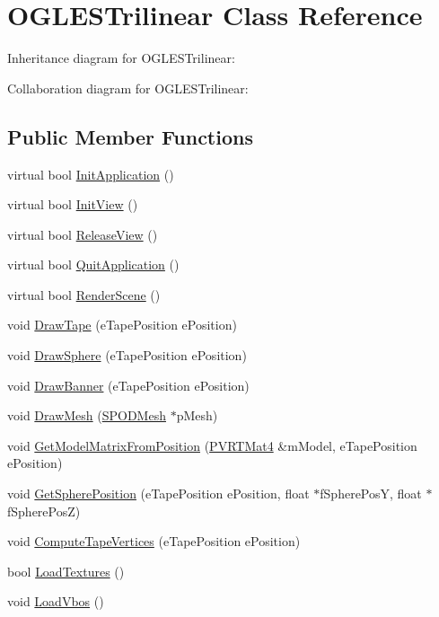 \hypertarget{class_o_g_l_e_s_trilinear}{\section{O\+G\+L\+E\+S\+Trilinear Class Reference}
\label{class_o_g_l_e_s_trilinear}
}


Inheritance diagram for O\+G\+L\+E\+S\+Trilinear\+:


Collaboration diagram for O\+G\+L\+E\+S\+Trilinear\+:
\subsection*{Public Member Functions}
\begin{DoxyCompactItemize}
\item 
virtual bool \hyperlink{class_o_g_l_e_s_trilinear_a898949e88ab142637d66ef4d8edee593}{Init\+Application} ()
\item 
virtual bool \hyperlink{class_o_g_l_e_s_trilinear_a389e00dabe60e6ca3978d695d204faa1}{Init\+View} ()
\item 
virtual bool \hyperlink{class_o_g_l_e_s_trilinear_a5e5850232b2d8e3912cf880288c9c7b5}{Release\+View} ()
\item 
virtual bool \hyperlink{class_o_g_l_e_s_trilinear_ac270de684046e18bbd7a540b55ca90f4}{Quit\+Application} ()
\item 
virtual bool \hyperlink{class_o_g_l_e_s_trilinear_a9bcd2d9d44515a311904fe4dd1342653}{Render\+Scene} ()
\item 
void \hyperlink{class_o_g_l_e_s_trilinear_aa0872e20c2116637070a735063a824a1}{Draw\+Tape} (e\+Tape\+Position e\+Position)
\item 
void \hyperlink{class_o_g_l_e_s_trilinear_a83e07a6af2eb7f1c388827db5239845f}{Draw\+Sphere} (e\+Tape\+Position e\+Position)
\item 
void \hyperlink{class_o_g_l_e_s_trilinear_ac52f766d31684290496f0b43fb455093}{Draw\+Banner} (e\+Tape\+Position e\+Position)
\item 
void \hyperlink{class_o_g_l_e_s_trilinear_a713c422745314c4f2ee9e1899f119c10}{Draw\+Mesh} (\hyperlink{struct_s_p_o_d_mesh}{S\+P\+O\+D\+Mesh} $\ast$p\+Mesh)
\item 
void \hyperlink{class_o_g_l_e_s_trilinear_a1b5c61de2f46b54d56d757069af4efb7}{Get\+Model\+Matrix\+From\+Position} (\hyperlink{struct_p_v_r_t_mat4}{P\+V\+R\+T\+Mat4} \&m\+Model, e\+Tape\+Position e\+Position)
\item 
void \hyperlink{class_o_g_l_e_s_trilinear_a69be578378b34622178fcc5d1dcc48a9}{Get\+Sphere\+Position} (e\+Tape\+Position e\+Position, float $\ast$f\+Sphere\+Pos\+Y, float $\ast$f\+Sphere\+Pos\+Z)
\item 
void \hyperlink{class_o_g_l_e_s_trilinear_adde9c78b19953aa2eddb627dbd74ca94}{Compute\+Tape\+Vertices} (e\+Tape\+Position e\+Position)
\item 
bool \hyperlink{class_o_g_l_e_s_trilinear_a92ad1692981df3c6e44add8aef8be582}{Load\+Textures} ()
\item 
void \hyperlink{class_o_g_l_e_s_trilinear_ad8a1aa0193d93f700eac5ce2b4ade26a}{Load\+Vbos} ()
\end{DoxyCompactItemize}


